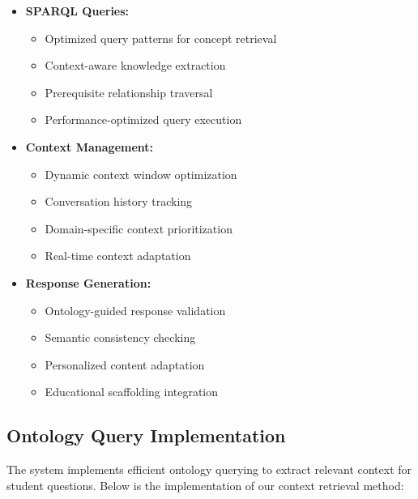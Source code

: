\begin{itemize}
  \item \textbf{SPARQL Queries:} 
    \begin{itemize}
      \item Optimized query patterns for concept retrieval
      \item Context-aware knowledge extraction
      \item Prerequisite relationship traversal
      \item Performance-optimized query execution
    \end{itemize}
  
  \item \textbf{Context Management:} 
    \begin{itemize}
      \item Dynamic context window optimization
      \item Conversation history tracking
      \item Domain-specific context prioritization
      \item Real-time context adaptation
    \end{itemize}
  
  \item \textbf{Response Generation:} 
    \begin{itemize}
      \item Ontology-guided response validation~
      \item Semantic consistency checking
      \item Personalized content adaptation
      \item Educational scaffolding integration
    \end{itemize}
\end{itemize}

\subsection{Ontology Query Implementation}
\label{subsec:ontology-query}

The system implements efficient ontology querying to extract relevant context for student questions. Below is the implementation of our context retrieval method:

